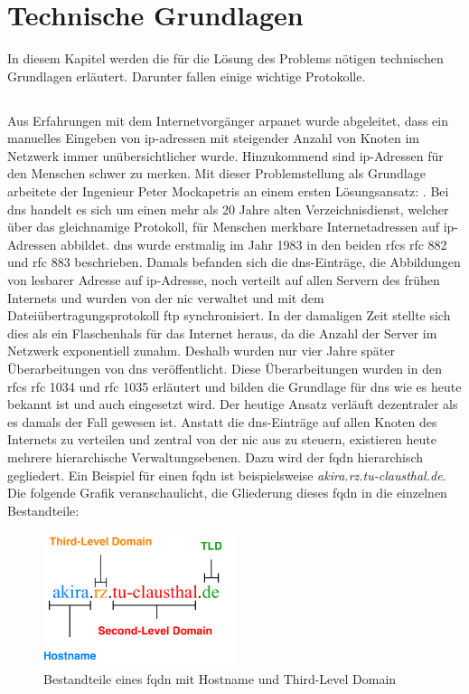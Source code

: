 \documentclass[titlepage]{report}
\begin{document}
\chapter*{Technische Grundlagen}
In diesem Kapitel werden die für die Lösung des Problems nötigen
technischen Grundlagen erläutert. Darunter fallen einige wichtige
Protokolle.
\section*{}
Aus Erfahrungen mit dem Internetvorgänger \gls{arpanet} wurde
abgeleitet, dass ein manuelles Eingeben von \gls{ip}\hyp{}adressen mit
steigender Anzahl von Knoten im Netzwerk immer unübersichtlicher wurde.
Hinzukommend sind \gls{ip}\hyp{}Adressen für den Menschen schwer zu
merken. Mit dieser Problemstellung als Grundlage arbeitete der Ingenieur
Peter Mockapetris an einem ersten Lösungsansatz: .
Bei \gls{dns} handelt es sich um einen mehr als 20 Jahre alten
Verzeichnisdienst, welcher über das gleichnamige Protokoll, für Menschen
merkbare Internetadressen auf \gls{ip}\hyp{}Adressen abbildet.
\gls{dns} wurde erstmalig im Jahr 1983 in den beiden \glspl{rfc}
\gls{rfc} 882\cite{RFC0882} und \gls{rfc} 883\cite{RFC0883} beschrieben.
Damals befanden sich die \gls{dns}\hyp{}Einträge, die Abbildungen von
lesbarer Adresse auf \gls{ip}\hyp{}Adresse, noch verteilt auf
allen Servern des frühen Internets und wurden von der \gls{nic} verwaltet
und mit dem Dateiübertragungsprotokoll \gls{ftp}
synchronisiert\cite{RFC1034}. In der damaligen Zeit stellte sich dies
als ein Flaschenhals für das Internet heraus, da die Anzahl der Server
im Netzwerk exponentiell zunahm. Deshalb wurden nur vier Jahre später
Überarbeitungen von \gls{dns} veröffentlicht. Diese Überarbeitungen
wurden in den \glspl{rfc} \gls{rfc} 1034 und \gls{rfc} 1035 erläutert
und bilden die Grundlage für \gls{dns} wie es heute bekannt ist und auch
eingesetzt wird. Der heutige Ansatz verläuft dezentraler als es damals
der Fall gewesen ist. Anstatt die \gls{dns}\hyp{}Einträge auf allen
Knoten des Internets zu verteilen und zentral von der \gls{nic} aus zu
steuern, existieren heute mehrere hierarchische Verwaltungsebenen. Dazu
wird der \gls{fqdn} hierarchisch gegliedert. Ein Beispiel für einen
\gls{fqdn} ist beispielsweise \emph{akira.rz.tu-clausthal.de}. Die
folgende Grafik veranschaulicht, die Gliederung dieses \gls{fqdn} in die
einzelnen Bestandteile:
\begin{figure}[h]
    \centering
    \includegraphics[width=0.5\textwidth]{figures/dnsname.pdf}
    \caption{Bestandteile eines \gls{fqdn} mit Hostname und Third-Level
    Domain}\label{fig:1}
\end{figure}
\end{document}
